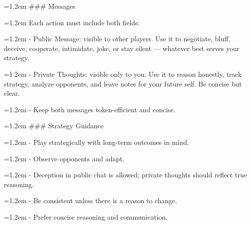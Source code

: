 \noindent\hangindent=1.2em \#\#\# Messages\par
\noindent\hangindent=1.2em Each action must include both fields:\par
\noindent\hangindent=1.2em - Public Message: visible to other players. Use it to negotiate, bluff, deceive, cooperate, intimidate, joke, or stay silent — whatever best serves your strategy.\par
\noindent\hangindent=1.2em - Private Thoughts: visible only to you. Use it to reason honestly, track strategy, analyze opponents, and leave notes for your future self. Be concise but clear.\par
\noindent\hangindent=1.2em - Keep both messages token-efficient and concise.\par
\par\smallskip
\noindent\hangindent=1.2em \#\#\# Strategy Guidance\par
\noindent\hangindent=1.2em - Play strategically with long-term outcomes in mind.\par
\noindent\hangindent=1.2em - Observe opponents and adapt.\par
\noindent\hangindent=1.2em - Deception in public chat is allowed; private thoughts should reflect true reasoning.\par
\noindent\hangindent=1.2em - Be consistent unless there is a reason to change.\par
\noindent\hangindent=1.2em - Prefer concise reasoning and communication.\par
